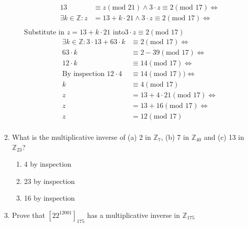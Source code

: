 \documentclass[10pt,\jkfside,a4paper]{article}
\begin{document}
\begin{enumerate}
\begin{enumerate}
\begin{equation}
\begin{split}
13 &\equiv z(\text{mod } 21) \wedge 3\cdot z \equiv 2(\text{mod } 17)\Longleftrightarrow\\
\exists k \in \mathbb{Z}: z &= 13 + k\cdot 21 \wedge 3\cdot z \equiv 2(\text{mod } 17)\Longleftrightarrow\\
\end{split}
\end{equation}
Substitute in $z = 13 + k\cdot 21$ into$ 3\cdot z \equiv 2(\text{mod } 17)$
\begin{equation}
\begin{split}
\exists k \in \mathbb{Z}: 3\cdot 13 + 63\cdot k &\equiv 2(\text{mod } 17)\Longleftrightarrow\\
63\cdot k &\equiv 2 - 39(\text{mod } 17)\Longleftrightarrow\\
12\cdot k &\equiv 14(\text{mod } 17)\Longleftrightarrow\\
\text{By inspection } 12\cdot 4 &\equiv 14(\text{mod } 17))\Longleftrightarrow\\
k &\equiv 4(\text{mod } 17)\\
z &= 13 + 4\cdot 21 (\text{mod } 17)\Longleftrightarrow\\
z &= 13 + 16 (\text{mod } 17)\Longleftrightarrow\\
z &= 12 (\text{mod } 17)\\
\end{split}
\end{equation}

\end{enumerate}

\item What is the multiplicative inverse of (a) 2 in $\mathbb{Z}_{7}$, (b) 7 in $\mathbb{Z}_{40}$ 
and (c) 13 in $\mathbb{Z}_{23}$?

\begin{enumerate}

\item 4 by inspection

\item 23 by inspection

\item 16 by inspection

\end{enumerate}

\item Prove that $[22^{12001}]_{175}$ has a multiplicative inverse in $\mathbb{Z}_{175}$


\end{enumerate}
\end{document}
